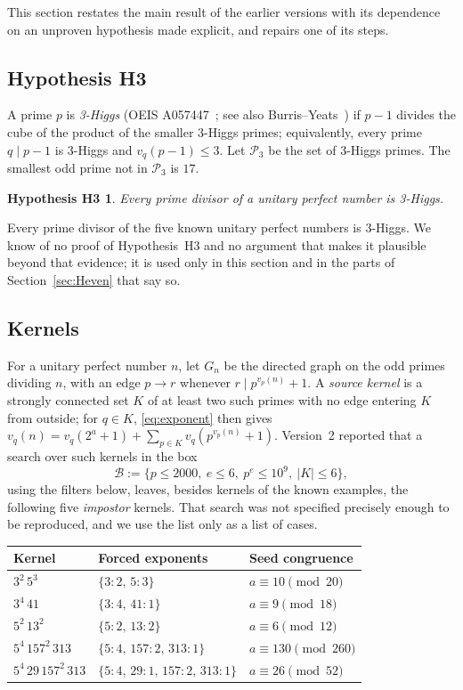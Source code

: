\documentclass[11pt]{amsart}
\theoremstyle{plain}
\newtheorem*{hypothesis}{Hypothesis H3}
\theoremstyle{definition}
\begin{document}
This section restates the main result of the earlier versions with its
dependence on an unproven hypothesis made explicit, and repairs one of its
steps.

\subsection{Hypothesis H3}
A prime $p$ is \emph{3-Higgs} (OEIS A057447~\cite{OEIS}; see also
Burris--Yeats~\cite{BurrisYeats}) if $p-1$ divides the cube of the product of
the smaller 3-Higgs primes; equivalently, every prime $q\mid p-1$ is 3-Higgs and
$v_q(p-1)\le 3$.  Let $\mathcal P_3$ be the set of 3-Higgs primes.  The smallest
odd prime not in $\mathcal P_3$ is $17$.

\begin{hypothesis}
Every prime divisor of a unitary perfect number is 3-Higgs.
\end{hypothesis}

Every prime divisor of the five known unitary perfect numbers is 3-Higgs.  We
know of no proof of Hypothesis~H3 and no argument that makes it plausible beyond
that evidence; it is used only in this section and in the parts of
Section~\ref{sec:Heven} that say so.

\subsection{Kernels}
For a unitary perfect number $n$, let $G_n$ be the directed graph on the odd
primes dividing $n$, with an edge $p\to r$ whenever $r\mid p^{v_p(n)}+1$.  A
\emph{source kernel} is a strongly connected set $K$ of at least two such primes
with no edge entering $K$ from outside; for $q\in K$, \eqref{eq:exponent} then
gives $v_q(n)=v_q(2^a+1)+\sum_{p\in K}v_q(p^{v_p(n)}+1)$.  Version~2 reported
that a search over such kernels in the box
\[
\mathcal B := \{ p \le 2000,\ e \le 6,\ p^e \le 10^9,\ |K| \le 6 \},
\]
using the filters below, leaves, besides kernels of the known examples, the
following five \emph{impostor} kernels.  That search was not specified
precisely enough to be reproduced, and we use the list only as a list of cases.
\begin{center}\begin{tabular}{lll}
\toprule
Kernel & Forced exponents & Seed congruence \\
\midrule
$3^2\,5^3$ & $\{3{:}2,\,5{:}3\}$ & $a \equiv 10 \pmod{20}$ \\
$3^4\,41$ & $\{3{:}4,\,41{:}1\}$ & $a \equiv 9 \pmod{18}$ \\
$5^2\,13^2$ & $\{5{:}2,\,13{:}2\}$ & $a \equiv 6 \pmod{12}$ \\
$5^4\,157^2\,313$ & $\{5{:}4,\,157{:}2,\,313{:}1\}$ & $a \equiv 130 \pmod{260}$ \\
$5^4\,29\,157^2\,313$ & $\{5{:}4,\,29{:}1,\,157{:}2,\,313{:}1\}$ & $a \equiv 26 \pmod{52}$ \\
\bottomrule
\end{tabular}\end{center}
\end{document}
